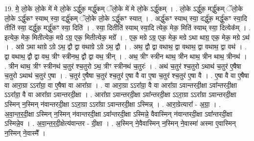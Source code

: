 \documentclass[17pt]{extarticle}
\begin{document}
19. मे॒ लो॒के लो॒के मे॑ मे लो॒के ऽर्द्धु॑क॒ मर्द्धु॑कम् ॅलो॒के मे॑ मे लो॒के ऽर्द्धु॑कम् । . लो॒के ऽर्द्धु॑क॒ मर्द्धु॑कम् ॅलो॒के लो॒के ऽर्द्धु॑कꣳ स्याथ् स्या॒ दर्द्धु॑कम् ॅलो॒के लो॒के ऽर्द्धु॑कꣳ स्यात् । . अर्द्धु॑कꣳ स्याथ् स्या॒ दर्द्धु॑क॒ मर्द्धु॑कꣳ स्या॒दि तीति॑ स्या॒ दर्द्धु॑क॒ मर्द्धु॑कꣳ स्या॒ दिति॑ । . स्या॒ दितीति॑ स्याथ् स्या॒दि त्येक॒ मेक॒ मिति॑ स्याथ् स्या॒ दित्येक᳚म् । . इत्येक॒ मेक॒ मितीत्येक॒ मग्रे ऽग्र॒ एक॒ मितीत्येक॒ मग्रे᳚ । . एक॒ मग्रे ऽग्र॒ एक॒ मेक॒ मग्रे ऽथा थाग्र॒ एक॒ मेक॒ मग्रे ऽथ॑ । . अग्रे ऽथा थाग्रे ऽग्रे ऽथ॒ द्वौ द्वा वथाग्रे ऽग्रे ऽथ॒ द्वौ । . अथ॒ द्वौ द्वा वथाथ॒ द्वा वथाथ॒ द्वा वथाथ॒ द्वा वथ॑ । . द्वा वथाथ॒ द्वौ द्वा वथ॒ त्रीꣳ स्त्रीनथ॒ द्वौ द्वा वथ॒ त्रीन् । . अथ॒ त्रीꣳ स्त्रीन थाथ॒ त्रीन थाथ॒ त्रीन थाथ॒ त्रीनथ॑ । . त्रीन थाथ॒ त्रीꣳ स्त्रीनथ॑ च॒तुर॑ श्च॒तुरो ऽथ॒ त्रीꣳ स्त्रीनथ॑ च॒तुरः॑ । . अथ॑ च॒तुर॑ श्च॒तुरो ऽथाथ॑ च॒तुर॑ ए॒षैषा च॒तुरो ऽथाथ॑ च॒तुर॑ ए॒षा । . च॒तुर॑ ए॒षैषा च॒तुर॑ श्च॒तुर॑ ए॒षा वै वा ए॒षा च॒तुर॑ श्च॒तुर॑ ए॒षा वै । . ए॒षा वै वा ए॒षैषा वा आरा॒ग्रा ऽऽरा᳚ग्रा॒ वा ए॒षैषा वा आरा᳚ग्रा । . वा आरा॒ग्रा ऽऽरा᳚ग्रा॒ वै वा आरा᳚ग्रा ऽवान्तरदी॒क्षा ऽवा᳚न्तरदी॒क्षा ऽऽरा᳚ग्रा॒ वै वा आरा᳚ग्रा ऽवान्तरदी॒क्षा । . आरा᳚ग्रा ऽवान्तरदी॒क्षा ऽवा᳚न्तरदी॒क्षा ऽऽरा॒ग्रा ऽऽरा᳚ग्रा ऽवान्तरदी॒क्षा ऽस्मिन् न॒स्मिन् न॑वान्तरदी॒क्षा ऽऽरा॒ग्रा ऽऽरा᳚ग्रा ऽवान्तरदी॒क्षा ऽस्मिन्न् । . आरा॒ग्रेत्यारा᳚ - अ॒ग्रा॒ । . अ॒वा॒न्त॒र॒दी॒क्षा ऽस्मिन् न॒स्मिन् न॑वान्तरदी॒क्षा ऽवा᳚न्तरदी॒क्षा ऽस्मिन्ने॒ वैवास्मिन् न॑वान्तरदी॒क्षा ऽवा᳚न्तरदी॒क्षा ऽस्मिन्ने॒व । . अ॒वा॒न्त॒र॒दी॒क्षेत्य॑वान्तर - दी॒क्षा । . अ॒स्मिन् ने॒वैवास्मिन् न॒स्मिन् ने॒वास्मा॑ अस्मा ए॒वास्मिन् न॒स्मिन् ने॒वास्मै᳚ । \newline
\end{document}
